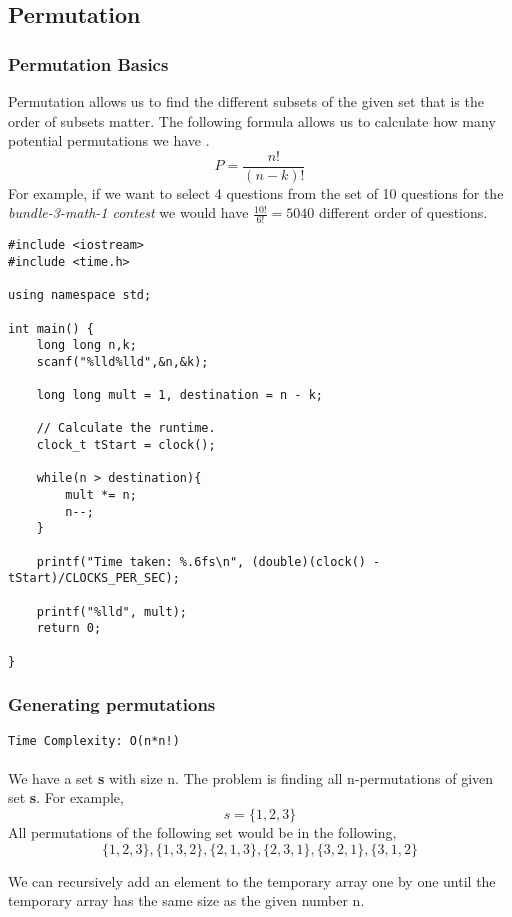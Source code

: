 \documentclass[12pt]{article}
\begin{document}
\subsection{Permutation}
\subsubsection{Permutation Basics}
Permutation allows us to find the different subsets of the given set that is the order of subsets matter. The following formula allows us to calculate how many potential permutations we have \cite{permutationbasic}.
\[P =\frac{n!}{(n-k)!} \] 
For example, if we want to select 4 questions from the set of 10 questions for the \textit{bundle-3-math-1 contest} we would have $\frac{10!}{6!} = 5040$ different order of questions.
\begin{verbatim}
#include <iostream>
#include <time.h>

using namespace std;

int main() {
    long long n,k;
    scanf("%lld%lld",&n,&k);
    
    long long mult = 1, destination = n - k; 
    
    // Calculate the runtime.
    clock_t tStart = clock();
    
    while(n > destination){
        mult *= n;
        n--;
    }
    
    printf("Time taken: %.6fs\n", (double)(clock() - tStart)/CLOCKS_PER_SEC);
    
    printf("%lld", mult);
    return 0;
    
}
\end{verbatim}
\clearpage
\subsubsection{Generating permutations}
\texttt{Time Complexity: O(n*n!) } \\ \\
We have a set \textbf{s} with size n. The problem is finding all n-permutations of given set \textbf{s}. For example,
\[ s = \{1, 2, 3\} \]
All permutations of the following set would be in the following,
\[ \{1,2,3\}, \{1,3,2\}, \{2,1,3\}, \{2,3,1\}, \{3,2,1\}, \{3,1,2\} \]

We can recursively add an element to the temporary array one by one until the temporary array has the same size as the given number n. \cite{permutationall}


\clearpage
\end{document}
